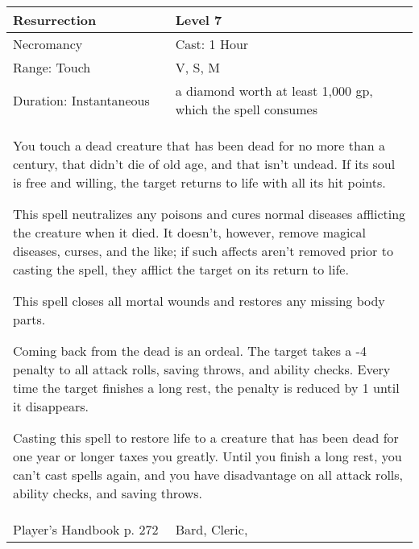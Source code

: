 \documentclass[11pt]{report}
\begin{document}
\begin{table}[H]
	\begin{tabular}{||p{6cm}|p{6cm}||}
		\hline\hline
		\bf{Resurrection} & Level 7\\ \hline
		Necromancy & Cast: 1 Hour\\ \hline
		Range: Touch & V, S, M\\ \hline
		Duration: Instantaneous & a diamond worth at least 1,000 gp, which the spell consumes\\ \hline
		\multicolumn{2}{||p{12cm}||}{You touch a dead creature that has been dead for no more than a century, that didn’t die of old age, and that isn’t undead. If its soul is free and willing, the target returns to life with all its hit points.

This spell neutralizes any poisons and cures normal diseases afflicting the creature when it died. It doesn’t, however, remove magical diseases, curses, and the like; if such affects aren’t removed prior to casting the spell, they afflict the target on its return to life.

This spell closes all mortal wounds and restores any missing body parts.

Coming back from the dead is an ordeal. The target takes a -4 penalty to all attack rolls, saving throws, and ability checks. Every time the target finishes a long rest, the penalty is reduced by 1 until it disappears.

Casting this spell to restore life to a creature that has been dead for one year or longer taxes you greatly. Until you finish a long rest, you can’t cast spells again, and you have disadvantage on all attack rolls, ability checks, and saving throws.}\\ \hline
Player's Handbook p. 272 & Bard, Cleric, \\ \hline\hline
	\end{tabular}
\end{table}
\end{document}
